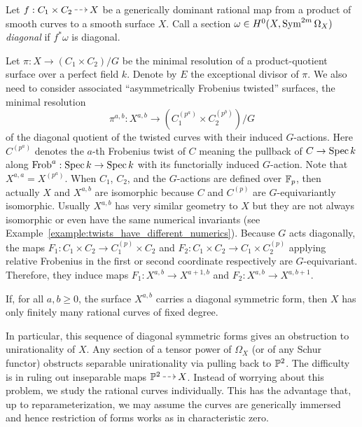 \documentclass[main.tex]{subfiles}
\begin{document}
\begin{defn}
Let $f : C_1 \times C_2 \rat X$ be a generically \etale dominant rational map from a product of smooth curves to a smooth surface $X$. Call a section $\omega \in H^0(X, \Sym^{2m}{\Omega_X})$ \textit{diagonal} if $f^* \omega$ is diagonal.
\end{defn}

Let $\pi : X \to (C_1 \times C_2)/G$ be the minimal resolution of a product-quotient surface over a perfect field $k$. Denote by $E$ the exceptional divisor of $\pi$. We also need to consider associated ``asymmetrically Frobenius twisted'' surfaces, the minimal resolution \[ \pi^{a,b} : X^{a,b} \to (C_1^{(p^a)} \times C_2^{(p^b)})/G \] 
of the diagonal quotient of the twisted curves with their induced $G$-actions. Here $C^{(p^a)}$ denotes the $a$-th Frobenius twist of $C$ meaning the pullback of $C \to \Spec{k}$ along $\Frob^a : \Spec{k} \to \Spec{k}$ with its functorially induced $G$-action. Note that $X^{a,a} = X^{(p^a)}$. When $C_1$, $C_2$, and the $G$-actions are defined over $\FF_p$, then actually $X$ and $X^{a,b}$ are isomorphic because $C$ and $C^{(p)}$ are $G$-equivariantly isomorphic. Usually $X^{a,b}$ has very similar geometry to $X$ but they are not always isomorphic or even have the same numerical invariants (see Example~\ref{example:twists_have_different_numerics}). Because $G$ acts diagonally, the maps $F_1 : C_1 \times C_2 \to C_1^{(p)} \times C_2$ and $F_2 : C_1 \times C_2 \to C_1 \times C_2^{(p)}$ applying relative Frobenius in the first or second coordinate respectively are $G$-equivariant. Therefore, they induce maps $F_1 : X^{a,b} \to X^{a+1, b}$ and $F_2 : X^{a,b} \to X^{a,b+1}$. 

\begin{theorem} \label{thm:obstruction}
If, for all $a,b \ge 0$, the surface $X^{a,b}$ carries a diagonal symmetric form, then $X$ has only finitely many rational curves of fixed degree. 
\end{theorem}

In particular, this sequence of diagonal symmetric forms gives an obstruction to unirationality of $X$. Any section of a tensor power of $\Omega_X$ (or of any Schur functor) obstructs separable unirationality via pulling back to $\P^2$. The difficulty is in ruling out inseparable maps $\P^2 \rat X$. Instead of worrying about this problem, we study the rational curves individually. This has the advantage that, up to reparameterization, we may assume the curves are generically immersed and hence restriction of forms works as in characteristic zero. 
\end{document}
